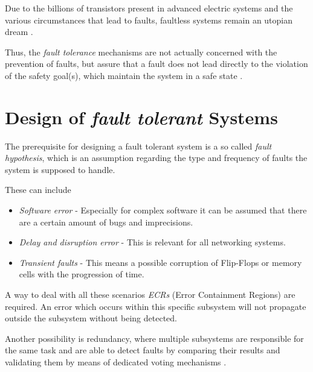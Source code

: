Due to the billions of transistors present in advanced electric systems and the various circumstances that lead to faults, faultless systems remain an utopian dream \cite{genesys}.

Thus, the \emph{fault tolerance} mechanisms are not actually concerned with the prevention of faults, but assure that a fault does not lead directly to the violation of the safety goal(s), which maintain the system in a safe state \cite{iso26262:1}.

\section{Design of \emph{fault tolerant} Systems}
The prerequisite for designing a fault tolerant system is a so called \emph{fault hypothesis}, which is an assumption regarding the type and frequency of faults the system is supposed to handle.

These can include
\begin{itemize}
\item \emph{Software error} - Especially for complex software it can be assumed that there are a certain amount of bugs and imprecisions.
\item \emph{Delay and disruption error} - This is relevant for all networking systems.
\item \emph{Transient faults} - This means a possible corruption of Flip-Flops or memory cells with the progression of time.
\end{itemize}

A way to deal with all these scenarios \emph{ECRs} (Error Containment Regions) are required. An error which occurs within this specific subsystem will not propagate outside the subsystem without being detected. 

Another possibility is redundancy, where multiple subsystems are responsible for the same task and are able to detect faults by comparing their results and validating them by means of dedicated voting mechanisms \cite{genesys}.